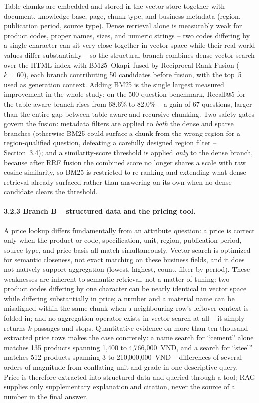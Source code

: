 \documentclass[11pt,a4paper]{article}
\begin{document}
Table chunks are embedded and stored in the vector store together with
document, knowledge-base, page, chunk-type, and business metadata (region,
publication period, source type). Dense retrieval alone is measurably weak
for product codes, proper names, sizes, and numeric strings -- two codes
differing by a single character can sit very close together in vector space
while their real-world values differ substantially -- so the structural
branch combines dense vector search over the HTML index with BM25~Okapi,
fused by Reciprocal Rank Fusion ($k=60$), each branch contributing 50
candidates before fusion, with the top~5 used as generation context. Adding
BM25 is the single largest measured improvement in the whole study: on the
500-question benchmark, Recall@5 for the table-aware branch rises from
68.6\% to 82.0\% -- a gain of 67 questions, larger than the entire gap
between table-aware and recursive chunking. Two safety gates govern the
fusion: metadata filters are applied to \emph{both} the dense and sparse
branches (otherwise BM25 could surface a chunk from the wrong region for a
region-qualified question, defeating a carefully designed region filter --
Section~3.4); and a similarity-score threshold is applied \emph{only} to the
dense branch, because after RRF fusion the combined score no longer shares a
scale with raw cosine similarity, so BM25 is restricted to re-ranking and
extending what dense retrieval already surfaced rather than answering on its
own when no dense candidate clears the threshold.

\paragraph{3.2.3 Branch B -- structured data and the pricing tool.}
A price lookup differs fundamentally from an attribute question: a price is
correct only when the product or code, specification, unit, region,
publication period, source type, and price basis all match simultaneously.
Vector search is optimized for semantic closeness, not exact matching on
these business fields, and it does not natively support aggregation (lowest,
highest, count, filter by period). These weaknesses are inherent to semantic
retrieval, not a matter of tuning: two product codes differing by one
character can be nearly identical in vector space while differing
substantially in price; a number and a material name can be misaligned
within the same chunk when a neighbouring row's leftover context is folded
in; and no aggregation operator exists in vector search at all -- it simply
returns $k$ passages and stops. Quantitative evidence on more than ten
thousand extracted price rows makes the case concretely: a name search for
``cement'' alone matches 135 products spanning 1,400 to 4,766,000~VND, and
a search for ``steel'' matches 512 products spanning 3 to
210,000,000~VND -- differences of several orders of magnitude from
conflating unit and grade in one descriptive query. Price is therefore
extracted into structured data and queried through a tool; RAG supplies only
supplementary explanation and citation, never the source of a number in the
final answer.
\end{document}

